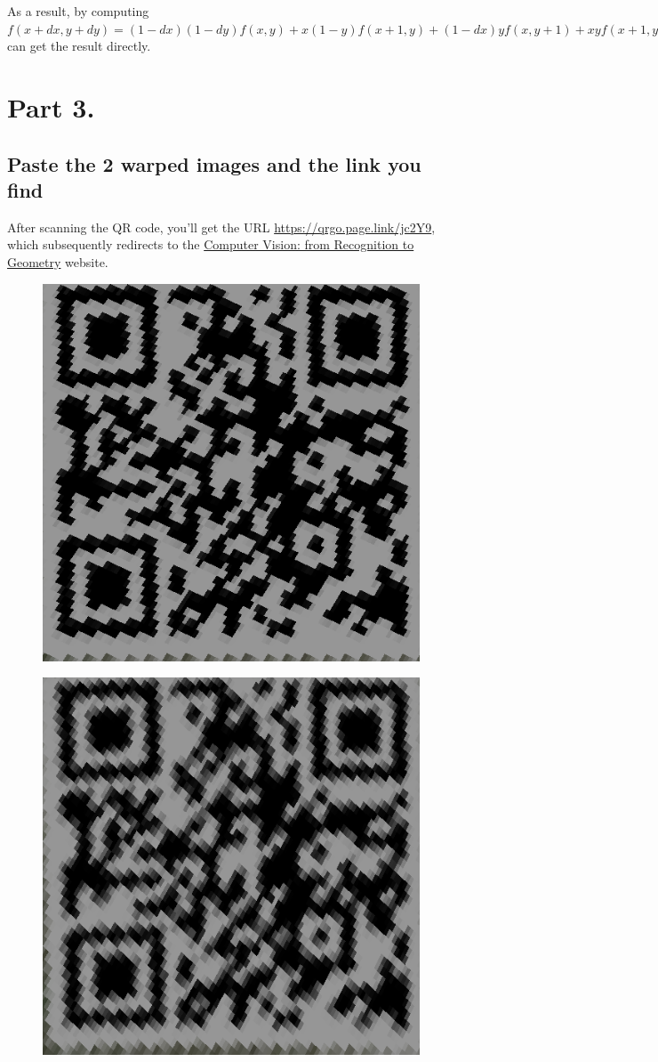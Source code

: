 \documentclass[a4paper, 12pt]{article}
\begin{document}
As a result, by computing $f(x+dx, y+dy)=(1-dx)(1-dy)f(x,y)+x(1-y)f(x+1,y)+(1-dx)yf(x,y+1) +xyf(x+1,y+1)$ can get the result directly.

\section{Part 3.}
\subsection{Paste the 2 warped images and the link you find}

After scanning the QR code, you'll get the URL \href{https://qrgo.page.link/jc2Y9}{https://qrgo.page.link/jc2Y9}, which subsequently redirects to the \href{http://media.ee.ntu.edu.tw/courses/cv/21S/}{Computer Vision: from Recognition to Geometry} website.

\begin{figure}[H]
    \centering
    \begin{minipage}{.4\textwidth}
        \centering
        \includegraphics[width=.5\linewidth]{./src/output3_1.png}
        \label{fig:output3_1}
    \end{minipage}%
    \begin{minipage}{.4\textwidth}
        \centering
        \includegraphics[width=.5\linewidth]{./src/output3_2.png}
        \label{fig:output3_2}
    \end{minipage}
\end{figure}
\end{document}
